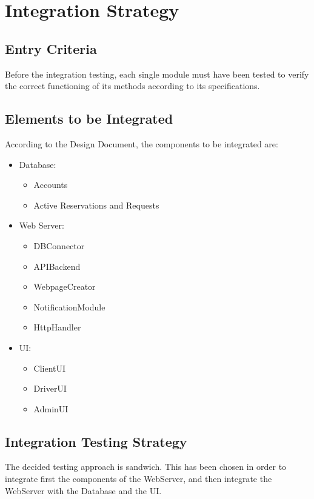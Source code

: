 \documentclass{article}
\begin{document}
\section{Integration Strategy}
\subsection{Entry Criteria}
Before the integration testing, each single module must have been tested to verify the correct functioning of its methods according to its specifications.
\subsection{Elements to be Integrated}
According to the Design Document, the components to be integrated are:
\begin{itemize}
	\item Database: 
	\begin{itemize}
		\item Accounts
		\item Active Reservations and Requests
	\end{itemize}
	\item Web Server: 
	\begin{itemize}
		\item DBConnector
		\item APIBackend
		\item WebpageCreator
		\item NotificationModule
		\item HttpHandler
	\end{itemize}
	\item UI:\@
	\begin{itemize}
		\item ClientUI
		\item DriverUI
		\item AdminUI
	\end{itemize}
\end{itemize}
\subsection{Integration Testing Strategy}
The decided testing approach is sandwich. This has been chosen in order to 
integrate first the components of the WebServer, and then integrate the WebServer with the Database and the UI. %
\end{document}
